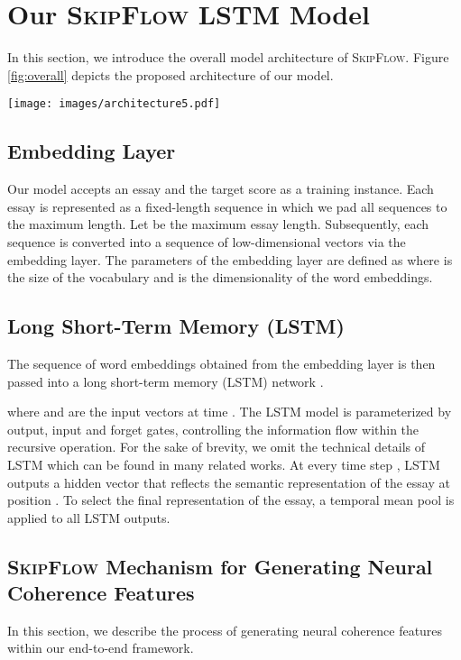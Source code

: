 \documentclass[letterpaper]{article}
\begin{document}
\section{Our \textsc{SkipFlow} LSTM Model}
In this section, we introduce the overall model architecture of \textsc{SkipFlow}. Figure \ref{fig:overall} depicts the proposed architecture of our model. 

\begin{figure*}[ht]
  
  \centering
    \texttt{[image: images/architecture5.pdf]}
    \caption{Illustration of our proposed \textsc{SkipFlow} LSTM model with width . Note that tensors depicted are \textbf{shared} parameters and there is only one tensor parameter in the entire architecture.}
    \label{fig:overall}
\end{figure*}

\subsection{Embedding Layer}
Our model accepts an essay and the target score as a training instance. Each essay is represented as a fixed-length sequence in which we pad all sequences to the maximum length. Let  be the maximum essay length. Subsequently, each sequence is converted into a sequence of low-dimensional vectors via the embedding layer. The parameters of the embedding layer are defined as  where  is the size of the vocabulary and  is the dimensionality of the word embeddings. 

\subsection{Long Short-Term Memory (LSTM)}
The sequence of word embeddings obtained from the embedding layer is then passed into a long short-term memory (LSTM) network \cite{hochreiter1997long}.


where  and  are the input vectors at time . The LSTM model is parameterized by output, input and forget gates, controlling the information flow within the recursive operation. For the sake of brevity, we omit the technical details of LSTM which can be found in many related works. At every time step , LSTM outputs a hidden vector  that reflects the semantic representation of the essay at position . To select the final representation of the essay, a temporal mean pool is applied to all LSTM outputs.




\subsection{\textsc{SkipFlow} Mechanism for Generating Neural Coherence Features}
In this section, we describe the process of generating neural coherence features within our end-to-end framework. 
\end{document}

